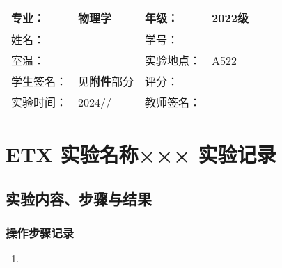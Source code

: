 \documentclass[dvipsnames, svgnames,a4paper,11pt]{article}
\begin{document}
	\begin{question}
		
	\end{question}
	
	\begin{question}
		
	\end{question}
	
	\begin{question}
		
	\end{question}
	
	
	
	
	\clearpage
	
	\begin{table}
		\renewcommand\arraystretch{1.7}
		\centering
		\begin{tabularx}{\textwidth}{|X|X|X|X|}
			\hline
			专业： & 物理学 & 年级： & 2022级 \\
			\hline
			姓名： &  & 学号： & \\
			\hline
			室温： &  & 实验地点： & A522 \\
			\hline
			学生签名：& 见\textbf{附件}部分 & 评分： &\\
			\hline
			实验时间：& 2024// & 教师签名：&\\
			\hline
		\end{tabularx}
	\end{table}
	
	\section{ETX 实验名称×××  \quad\heiti 实验记录}
	
	\subsection{实验内容、步骤与结果}
	
	\subsubsection{操作步骤记录}
	\begin{enumerate}
		\item 
	\end{enumerate}	
	
\end{document}
